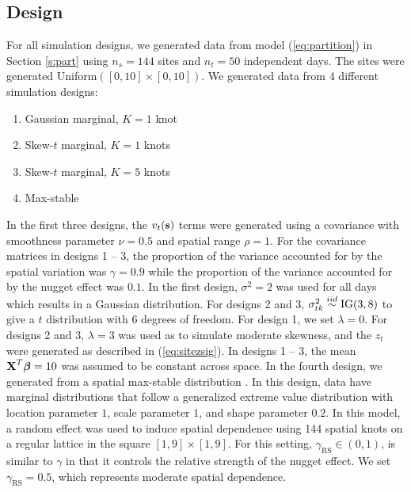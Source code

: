 \documentclass[useAMS,usenatbib,referee]{biom}
\begin{document}
\subsection{Design}\label{s:simdesign}
For all simulation designs, we generated data from model (\ref{eq:partition}) in Section \ref{s:part} using $n_s=144$ sites and $n_t=50$ independent days.
The sites were generated Uniform$([0, 10] \times [0, 10])$.
We generated data from 4 different simulation designs:
\begin{enumerate}[leftmargin=3em]
  \item Gaussian marginal, $K=1$ knot
  \item Skew-$t$ marginal, $K=1$ knots
  \item Skew-$t$ marginal, $K=5$ knots
  \item Max-stable
\end{enumerate}
In the first three designs, the $v_t(\mbox{\bf s})$ terms were generated using a \Matern covariance with smoothness parameter $\nu = 0.5$ and spatial range $\rho = 1$.
For the covariance matrices in designs 1 -- 3, the proportion of the variance accounted for by the spatial variation was $\gamma = 0.9$ while the proportion of the variance accounted for by the nugget effect was $0.1$.
In the first design, $\sigma^2 = 2$ was used for all days which results in a Gaussian distribution.
For designs 2 and 3, $\sigma^2_{tk} \stackrel{iid}{\sim} \text{IG}(3, 8)$ to give a $t$ distribution with 6 degrees of freedom.
For design 1, we set $\lambda = 0$.
For designs 2 and 3, $\lambda = 3$ was used as to simulate moderate skewness, and the $z_t$ were generated as described in (\ref{eq:sitezsig}).
In designs 1 -- 3, the mean $\mbox{\bf X}^T \mbox{\boldmath $\beta$} = 10$ was assumed to be constant across space.
In the fourth design, we generated from a spatial max-stable distribution \citep{Reich2012}.
In this design, data have marginal distributions that follow a generalized extreme value distribution with location parameter $1$, scale parameter $1$, and shape parameter $0.2$.
In this model, a random effect was used to induce spatial dependence using 144 spatial knots on a regular lattice in the square $[1, 9] \times [1, 9]$.
For this setting, $\gamma_{\text{RS}} \in (0, 1)$, is similar to $\gamma$ in that it controls the relative strength of the nugget effect.
We set $\gamma_{\text{RS}} = 0.5$, which represents moderate spatial dependence.
\end{document}
